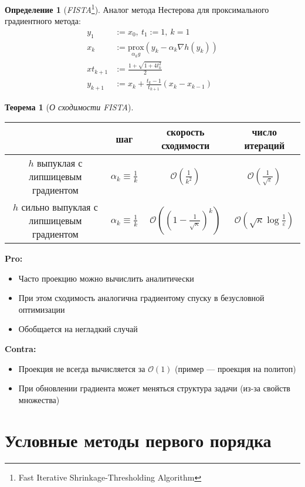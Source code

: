 \documentclass[11pt,a4paper]{report}
\def\eps{\varepsilon}
\theoremstyle{definition}
\theoremstyle{definition}
\newtheorem{theorem}{Теорема}[section]
\theoremstyle{definition}
\newtheorem*{definition}{Определение}
\begin{document}
	\begin{definition}[\textit{FISTA}\footnote{Fast Iterative Shrinkage-Thresholding Algorithm}]
		Аналог метода Нестерова для проксимального градиентного метода:
		\begin{align*}
			y_{1} &:= x_{0},\ t_{1} := 1,\ k = 1\\
			x_{k} &:= \underset{\alpha_k g}{\mathrm{prox}}(y_k - \alpha_k \nabla h(y_k))\\
			xt_{k+1} &:= \frac{1 + \sqrt{1 + 4t_k^2}}{2}\\
			y_{k+1} &:= x_{k} + \frac{t_k - 1}{t_{k+1}}(x_k - x_{k-1})
		\end{align*}
	\end{definition}
	\begin{theorem}[\textit{О сходимости FISTA}]$  $\\
		\bgroup
		\def\arraystretch{1.5}
		\begin{tabular}{c|c|c|c}
			\hline 
			& шаг & скорость сходимости & число итераций\\
			\hline
			$ h $ выпуклая с липшицевым градиентом & $ \alpha_k \equiv \frac{1}{k} $ & $ \mathcal{O}\left (  \frac{1}{k^2} \right ) $ & $ \mathcal{O}\left (  \frac{1}{\sqrt{\eps}} \right ) $  \\
			\hline
			$ h $ сильно выпуклая с липшицевым градиентом & $ \alpha_k \equiv \frac{1}{k} $ & $ \mathcal{O}\left ( \left ( 1 - \frac{1}{\sqrt{\kappa}} \right )^{k} \right ) $ & $ \mathcal{O}(\sqrt{\kappa} \log \frac{1}{\eps}) $ \\
			\hline 
		\end{tabular}
		\egroup
	\end{theorem}
	\noindent \textbf{Pro:}
	\begin{itemize}[$\diamond$]
		\item Часто проекцию можно вычислить аналитически
		\item При этом сходимость аналогична градиентому спуску в безусловной оптимизации
		\item Обобщается на негладкий случай
	\end{itemize}
	\textbf{Contra:}
	\begin{itemize}[$\diamond$]
		\item Проекция не всегда вычисляется за $ \mathcal{O}(1) $ (пример — проекция на политоп)
		\item При обновлении градиента может меняться структура задачи (из-за свойств множества)
	\end{itemize}
	\section{Условные методы первого порядка}
\end{document}
